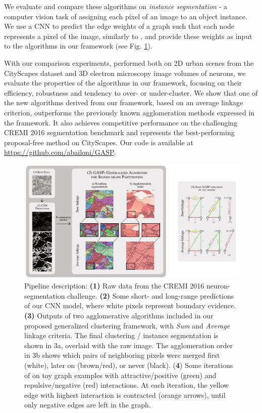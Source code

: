 We evaluate and compare these algorithms on \emph{instance segmentation} - a computer vision task of assigning each pixel of an image to an object instance. 
We use a CNN to predict the edge weights of a graph such that each node represents a pixel of the image, similarly to \cite{liu2018affinity,lee2017superhuman,wolf2018mutex}, and provide these weights as input to the algorithms in our framework (see Fig. \ref{fig:intro_figure}). 


With our comparison experiments, performed both on 2D urban scenes from the CityScapes dataset and 3D electron microscopy image volumes of neurons, we evaluate the properties of the algorithms in our framework, focusing on their efficiency, robustness and tendency to over- or under-cluster.
We show that one of the new algorithms derived from our framework, based on an average linkage criterion, outperforms the previously known agglomeration methods expressed in the framework. It also achieves competitive performance on the challenging CREMI 2016 segmentation benchmark and represents the best-performing proposal-free method on CityScapes.
Our code is available at \url{https://github.com/abailoni/GASP}.


\begin{figure}[t]
\centering
\includegraphics[width=\textwidth]{figs/intro_image_v3.pdf} %
\caption{ Pipeline description: \textbf{(1)} Raw data from the CREMI 2016 neuron-segmentation challenge. \textbf{(2)} Some short- and long-range predictions of our CNN model, where white pixels represent boundary evidence. \textbf{(3)} Outputs of two agglomerative algorithms included in our proposed generalized clustering framework, with \emph{Sum} and \emph{Average} linkage criteria. The final clustering / instance segmentation is shown in 3a, overlaid with the raw image.  The  agglomeration order in 3b shows which pairs of neighboring pixels were merged first (white), later on (brown/red), or never (black). (\textbf{4}) Some iterations of \algname{} on toy graph examples with attractive/positive (green) and repulsive/negative (red) interactions. At each iteration, the yellow edge with highest interaction is contracted (orange arrows), until only negative edges are left in the graph.
\label{fig:intro_figure}}
\end{figure}
